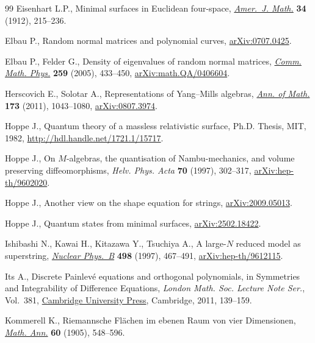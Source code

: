 \documentclass[pdftex]{sigma}
\numberwithin{equation}{section}
\theoremstyle{definition}
\begin{document}
\begin{thebibliography}{99}
Eisenhart L.P., Minimal surfaces in {E}uclidean four-space,
 \href{https://doi.org/10.2307/2370220}{\textit{Amer.~J. Math.}} \textbf{34}
 (1912), 215--236.

Elbau P., Random normal matrices and polynomial curves,
 \href{http://arxiv.org/abs/0707.0425}{arXiv:0707.0425}.

Elbau P., Felder G., Density of eigenvalues of random normal matrices,
 \href{https://doi.org/10.1007/s00220-005-1372-z}{\textit{Comm. Math. Phys.}}
 \textbf{259} (2005), 433--450,
 \href{http://arxiv.org/abs/math.QA/0406604}{arXiv:math.QA/0406604}.

Herscovich E., Solotar A., Representations of {Y}ang--{M}ills algebras,
 \href{https://doi.org/10.4007/annals.2011.173.2.12}{\textit{Ann. of Math.}}
 \textbf{173} (2011), 1043--1080,
 \href{http://arxiv.org/abs/0807.3974}{arXiv:0807.3974}.
 
Hoppe J., Quantum theory of a massless relativistic surface, Ph.D. Thesis,
 {MIT}, 1982, \url{http://hdl.handle.net/1721.1/15717}.

Hoppe J., On {$M$}-algebras, the quantisation of {N}ambu-mechanics, and volume
 preserving diffeomorphisms, \textit{Helv. Phys. Acta} \textbf{70} (1997),
 302--317, \href{http://arxiv.org/abs/hep-th/9602020}{arXiv:hep-th/9602020}.

Hoppe J., Another view on the shape equation for strings,
 \href{http://arxiv.org/abs/2009.05013}{arXiv:2009.05013}.

Hoppe J., Quantum states from minimal surfaces,
 \href{http://arxiv.org/abs/2502.18422}{arXiv:2502.18422}.

Ishibashi N., Kawai H., Kitazawa Y., Tsuchiya A., A large-{$N$} reduced model
 as superstring,
 \href{https://doi.org/10.1016/S0550-3213(97)00290-3}{\textit{Nuclear
 Phys.~B}} \textbf{498} (1997), 467--491,
 \href{http://arxiv.org/abs/hep-th/9612115}{arXiv:hep-th/9612115}.

Its A., Discrete Painlev\'e equations and orthogonal polynomials, in Symmetries
 and Integrability of Difference Equations, \textit{London Math. Soc. Lecture
 Note Ser.}, Vol.~381,
 \href{https://doi.org/10.1017/CBO9780511997136.007}{Cambridge University
 Press}, Cambridge, 2011, 139--159.

Kommerell K., Riemannsche {F}l\"achen im ebenen {R}aum von vier {D}imensionen,
 \href{https://doi.org/10.1007/BF01561096}{\textit{Math. Ann.}} \textbf{60}
 (1905), 548--596.


\end{thebibliography}
\end{document}
